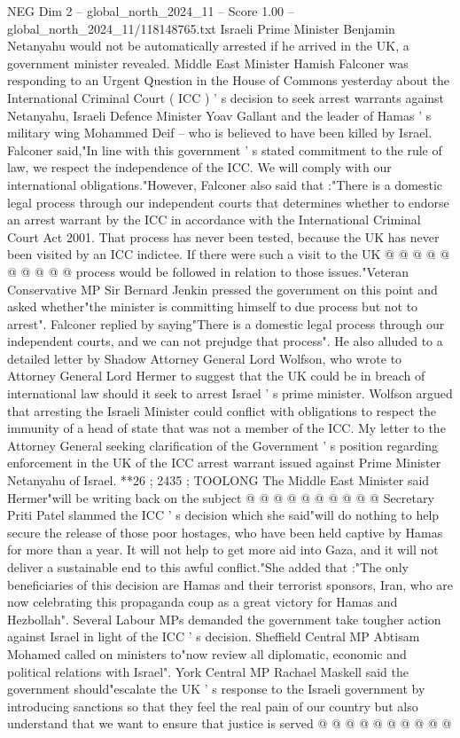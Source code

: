 \begin{textsample}{NEG Dim 2 – global\_north\_2024\_11 – Score 1.00 – global\_north\_2024\_11/118148765.txt}  \label{ex:f2_neg_094}
Israeli Prime Minister Benjamin Netanyahu would not be automatically arrested if he arrived in the UK, a government minister revealed.
Middle East Minister Hamish Falconer was responding to an Urgent Question in the House of Commons yesterday about the International Criminal Court ( ICC ) ' s decision to seek arrest warrants against Netanyahu, Israeli Defence Minister Yoav Gallant and the leader of Hamas ' s military wing Mohammed Deif -- who is believed to have been killed by Israel.
Falconer said,"In line with this government ' s stated commitment to the rule of law, we respect the independence of the ICC.
We will comply with our international obligations."However, Falconer also said that :"There is a domestic legal process through our independent courts that determines whether to endorse an arrest warrant by the ICC in accordance with the International Criminal Court Act 2001.
That process has never been tested, because the UK has never been visited by an ICC indictee.
If there were such a visit to the UK @ @ @ @ @ @ @ @ @ @ process would be followed in relation to those issues."Veteran Conservative MP Sir Bernard Jenkin pressed the government on this point and asked whether"the minister is committing himself to due process but not to arrest".
Falconer replied by saying"There is a domestic legal process through our independent courts, and we can not prejudge that process".
He also alluded to a detailed letter by Shadow Attorney General Lord Wolfson, who wrote to Attorney General Lord Hermer to suggest that the UK could be in breach of international law should it seek to arrest Israel ' s prime minister.
Wolfson argued that arresting the Israeli Minister could conflict with obligations to respect the immunity of a head of state that was not a member of the ICC.
My letter to the Attorney General seeking clarification of the Government ' s position regarding enforcement in the UK of the ICC arrest warrant issued against Prime Minister Netanyahu of Israel. **26 ; 2435 ; TOOLONG The Middle East Minister said Hermer"will be writing back on the subject @ @ @ @ @ @ @ @ @ @ Secretary Priti Patel slammed the ICC ' s decision which she said"will do nothing to help secure the release of those poor hostages, who have been held captive by Hamas for more than a year.
It will not help to get more aid into Gaza, and it will not deliver a sustainable end to this awful conflict."She added that :"The only beneficiaries of this decision are Hamas and their terrorist sponsors, Iran, who are now celebrating this propaganda coup as a great victory for Hamas and Hezbollah".
Several Labour MPs demanded the government take tougher action against Israel in light of the ICC ' s decision.
Sheffield Central MP Abtisam Mohamed called on ministers to"now review all diplomatic, economic and political relations with Israel".
York Central MP Rachael Maskell said the government should"escalate the UK ' s response to the Israeli government by introducing sanctions so that they feel the real pain of our country but also understand that we want to ensure that justice is served @ @ @ @ @ @ @ @ @ @

\end{textsample}
